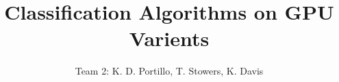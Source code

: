 \documentclass{IEEEtran}
\begin{document}
 
\title{Classification Algorithms on GPU Varients}
\author{Team 2: K. D. Portillo, T. Stowers, K. Davis}
\maketitle
{}





\end{document}
